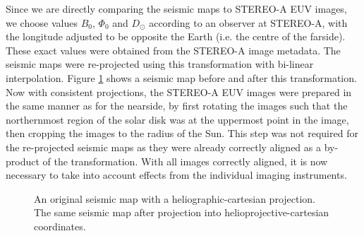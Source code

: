 \documentclass[11pt,a4paper,onecolumn]{report}
\begin{document}
Since we are directly comparing the seismic maps to STEREO-A EUV images, we
choose values \(B_0\), \(\Phi_0\) and \(D_\odot\) according to an observer at
STEREO-A, with the longitude adjusted to be opposite the Earth (i.e. the centre
of the farside). These exact values were obtained from the STEREO-A image
metadata. The seismic maps were re-projected using this transformation with
bi-linear interpolation. Figure \ref{fig:projection} shows a seismic map before
and after this transformation. \\

Now with consistent projections, the STEREO-A EUV images were prepared in the
same manner as for the nearside, by first rotating the images such that the
northernmost region of the solar disk was at the uppermost point in the image,
then cropping the images to the radius of the Sun. This step was not required
for the re-projected seismic maps as they were already correctly aligned as a
by-product of the transformation. With all images correctly aligned, it is now
necessary to take into account effects from the individual imaging instruments.

\begin{figure}[t]%
  \centering
  \qquad

  \caption[]{ An original seismic map with a
  heliographic-cartesian projection.  The same
  seismic map after projection into helioprojective-cartesian coordinates.}
  \label{fig:projection}
\end{figure}
\end{document}
